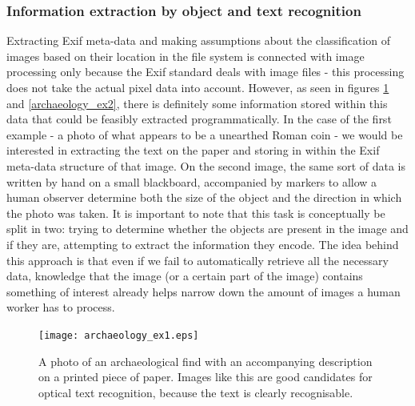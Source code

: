 \documentclass [12pt,a4paper]{report}
\begin{document}
\subsubsection{Information extraction by object and text recognition}

Extracting Exif meta-data and making assumptions about the classification of images based on their location in the file system is connected with image processing only because the Exif standard deals with image files - this processing does not take the actual pixel data into account. However, as seen in figures \ref{archaeology_ex1} and \ref{archaeology_ex2}, there is definitely some information stored within this data that could be feasibly extracted programmatically. In the case of the first example - a photo of what appears to be a unearthed Roman coin - we would be interested in extracting the text on the paper and storing in within the Exif meta-data structure of that image. On the second image, the same sort of data is written by hand on a small blackboard, accompanied by markers to allow a human observer determine both the size of the object and the direction in which the photo was taken. It is important to note that this task is conceptually be split in two: trying to determine whether the objects are present in the image and if they are, attempting to extract the information they encode. The idea behind this approach is that even if we fail to automatically retrieve all the necessary data, knowledge that the image (or a certain part of the image) contains something of interest already helps narrow down the amount of images a human worker has to process.

\begin{center}
\begin{figure}[h]
\centering
\texttt{[image: archaeology\_ex1.eps]} %
\caption[A photo of an archaeological find]{A photo of an archaeological find with an accompanying description on a printed piece of paper. Images like this are good candidates for optical text recognition, because the text is clearly recognisable.}
\label{archaeology_ex1}
\end{figure}
\end{center}
\end{document}
